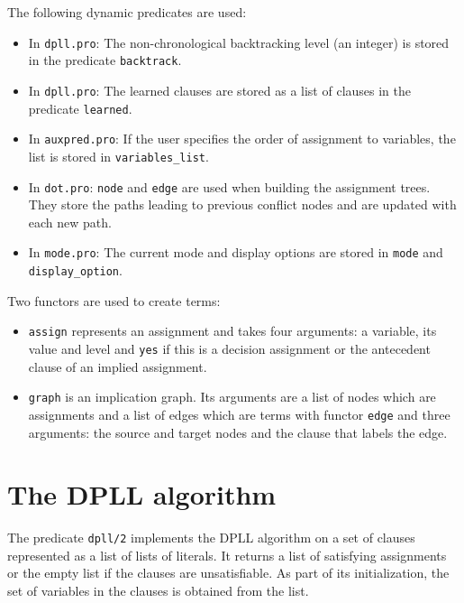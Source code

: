 \documentclass[11pt]{report}
\newcommand*{\p}[1]{\textup{\texttt{#1}}}
\begin{document}
The following dynamic predicates are used:
\begin{itemize}
\item In \p{dpll.pro}: The non-chronological backtracking level (an
 integer) is stored in the predicate \p{backtrack}.

\item In \p{dpll.pro}: The learned clauses are stored as a list of
clauses in the predicate \p{learned}.

\item In \p{auxpred.pro}: If the user specifies the order of assignment
to variables, the list is stored in \p{variables\_list}.

\item In \p{dot.pro}: \p{node} and \p{edge} are used when building the
assignment trees. They store the paths leading to previous conflict
nodes and are updated with each new path.

\item In \p{mode.pro}: The current mode and display options are stored
in \p{mode} and \p{display\_option}. 

\end{itemize}

Two functors are used to create terms:
\begin{itemize}

\item \p{assign} represents an assignment and takes four arguments: a
variable, its value and level and \p{yes} if this is a decision
assignment or the antecedent clause of an implied assignment.

\item \p{graph} is an implication graph. Its arguments are a list of
nodes which are assignments and a list of edges which are terms with
functor \p{edge} and three arguments: the source and target nodes
and the clause that labels the edge.
\end{itemize}


\section{The DPLL algorithm}

The predicate \p{dpll/2} implements the DPLL algorithm on a set of
clauses represented as a list of lists of literals. It returns a list of
satisfying assignments or the empty list if the clauses are
unsatisfiable. As part of its initialization, the set of variables in
the clauses is obtained from the list.
\end{document}
